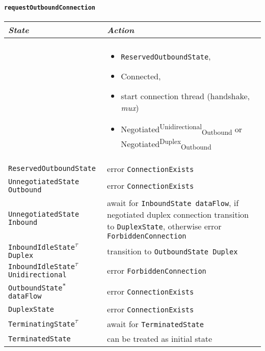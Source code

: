 \documentclass{article}
\def\InitialState{\textbullet}
\def\ReservedOutboundState{\texttt{ReservedOutboundState}}
\def\UnnegotiatedStateOut{\texttt{UnnegotiatedState Outbound}}
\def\UnnegotiatedStateIn{\texttt{UnnegotiatedState Inbound}}
\def\OutboundStateDup{\texttt{OutboundState\phantom{\textsuperscript{$\tau$}} Duplex}}
\def\OutboundStateAny{\texttt{OutboundState\textsuperscript{*} dataFlow}}
\def\DuplexState{\texttt{DuplexState}}
\def\InboundStateAny{\texttt{InboundState dataFlow}}
\def\InboundIdleStateUni{\texttt{InboundIdleState\textsuperscript{$\tau$} Unidirectional}}
\def\InboundIdleStateDup{\texttt{InboundIdleState\textsuperscript{$\tau$} Duplex}}
\def\TerminatingState{\texttt{TerminatingState\textsuperscript{$\tau$}}}
\def\TerminatedState{\texttt{TerminatedState}}
\def\Connected{\textsf{Connected}}
\def\NegotiatedUniOut{\textsf{Negotiated}\textsuperscript{\textsf{Unidirectional}}\textsubscript{\textsf{Outbound}}}
\def\NegotiatedDupOut{\textsf{Negotiated}\textsuperscript{\textsf{Duplex}}\textsubscript{\textsf{Outbound}}}
\def\mux{\textit{mux}}
\begin{document}
\paragraph{\texttt{requestOutboundConnection}}\label{sub:includeOutboundConnect}
\begin{center}
  \begin{tabular}[h]{ll}
    \textit{State}           & \textit{Action} \\\hline\\[2pt]
    \InitialState{}          &
      \begin{minipage}[t]{8cm}
        \begin{itemize}
          \item \ReservedOutboundState{},
          \item \Connected{},
          \item start connection thread (handshake, \mux{})
          \item \NegotiatedUniOut{} or \NegotiatedDupOut{}
        \end{itemize}
      \end{minipage}
      \vspace{8pt}\\
    \ReservedOutboundState{} & error \texttt{ConnectionExists} \\[8pt]
    \UnnegotiatedStateOut{}  & error \texttt{ConnectionExists} \\[8pt]
    \UnnegotiatedStateIn{  } &
      \begin{minipage}[t]{7cm}
        await for \InboundStateAny{}, if negotiated duplex connection
        transition to \DuplexState{}, otherwise error
        \texttt{ForbiddenConnection}
      \end{minipage}
      \vspace{8pt}\\
    \InboundIdleStateDup{}   & transition to \OutboundStateDup{}  \\[8pt]
    \InboundIdleStateUni{}   & error \texttt{ForbiddenConnection} \\[8pt]
    \OutboundStateAny{}      & error \texttt{ConnectionExists} \\[8pt]
    \DuplexState{}           & error \texttt{ConnectionExists} \\[8pt]
    \TerminatingState{}      & await for \TerminatedState{}    \\[8pt]
    \TerminatedState{}       & can be treated as initial state \\[8pt]
  \end{tabular}
\end{center}
\end{document}
